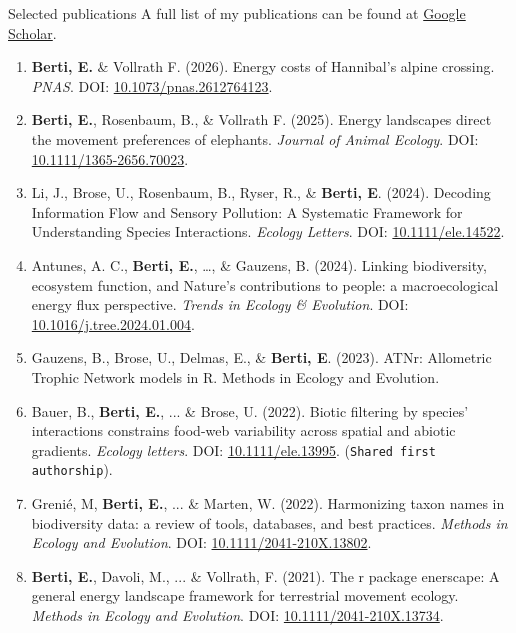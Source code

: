 \documentclass{resume} %
\begin{document}
\begin{rSection}{Selected publications}
A full list of my publications can be found at \href{https://scholar.google.com/citations?hl=en&user=5KPh-oUAAAAJ&view_op=list_works&sortby=pubdate}{Google Scholar}.

\begin{enumerate}
    \setlength\itemsep{-0.5em}
    \item \textbf{Berti, E.} \& Vollrath F. (2026). Energy costs of Hannibal's alpine crossing. \textit{PNAS}. DOI: \href{https://doi.org/10.1073/pnas.2612764123}{10.1073/pnas.2612764123}.
    \item \textbf{Berti, E.}, Rosenbaum, B., \& Vollrath F. (2025). Energy landscapes direct the movement preferences of elephants. \textit{Journal of Animal Ecology}. DOI: \href{https://doi.org/10.1111/1365-2656.70023}{10.1111/1365-2656.70023}.
    \item Li, J., Brose, U., Rosenbaum, B., Ryser, R., \& \textbf{Berti, E}. (2024). Decoding Information Flow and Sensory Pollution: A Systematic Framework for Understanding Species Interactions. \textit{Ecology Letters}. DOI: \href{https://doi.org/10.1111/ele.14522}{10.1111/ele.14522}.
    \item Antunes, A. C., \textbf{Berti, E.}, \dots, \& Gauzens, B. (2024). Linking biodiversity, ecosystem function, and Nature’s contributions to people: a macroecological energy flux perspective. \textit{Trends in Ecology \& Evolution}. DOI: \href{https://doi.org/10.1016/j.tree.2024.01.004}{10.1016/j.tree.2024.01.004}.
    \item Gauzens, B., Brose, U., Delmas, E., \& \textbf{Berti, E}. (2023). ATNr: Allometric Trophic Network models in R. Methods in Ecology and Evolution.
    \item Bauer, B., \textbf{Berti, E.}, ... \& Brose, U. (2022). Biotic filtering by species’ interactions constrains food-web variability across spatial and abiotic gradients. \textit{Ecology letters}. DOI: \href{https://doi.org/10.1111/ele.13995}{10.1111/ele.13995}. (\texttt{Shared first authorship}).
    \item Grenié, M, \textbf{Berti, E.}, ... \& Marten, W. (2022). Harmonizing taxon names in biodiversity data: a review of tools, databases, and best practices. \textit{Methods in Ecology and Evolution}. DOI: \href{https://doi.org/10.1111/2041-210X.13802}{10.1111/2041-210X.13802}.
    \item \textbf{Berti, E.}, Davoli, M., ... \& Vollrath, F. (2021). The r package enerscape: A general energy landscape framework for terrestrial movement ecology. \textit{Methods in Ecology and Evolution}. DOI: \href{https://doi.org/10.1111/2041-210X.13734}{10.1111/2041-210X.13734}.

\end{enumerate}
\end{rSection}
\end{document}
